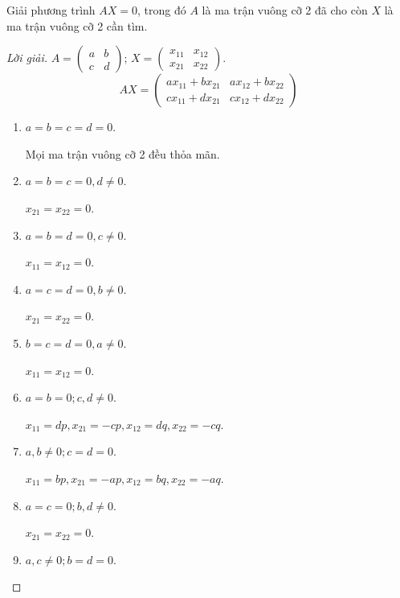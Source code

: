 \begin{exercise}
    Giải phương trình $AX = 0$, trong đó $A$ là ma trận vuông cỡ 2 đã cho còn $X$ là ma trận vuông cỡ 2 cần tìm.
\end{exercise}

\begin{proof}[Lời giải]
    $A = \begin{pmatrix}a & b \\ c & d\end{pmatrix}$; $X = \begin{pmatrix}x_{11} & x_{12} \\ x_{21} & x_{22}\end{pmatrix}$.
    \[
        AX =
        \begin{pmatrix}
            ax_{11}+bx_{21} & ax_{12}+bx_{22} \\
            cx_{11}+dx_{21} & cx_{12}+dx_{22}
        \end{pmatrix}
    \]
    \begin{enumerate}[label = Trường hợp \arabic*:,itemindent=2cm]
        \item $a = b = c = d = 0$.
              
              Mọi ma trận vuông cỡ 2 đều thỏa mãn.
        \item $a = b = c = 0, d\ne 0$.
              
              $x_{21} = x_{22} = 0$.
        \item $a = b = d = 0, c\ne 0$.
              
              $x_{11} = x_{12} = 0$.
        \item $a = c = d = 0, b\ne 0$.
              
              $x_{21} = x_{22} = 0$.
        \item $b = c = d = 0, a\ne 0$.
              
              $x_{11} = x_{12} = 0$.
        \item $a = b = 0; c, d\ne 0$.
              
              $x_{11} = dp, x_{21} = -cp, x_{12} = dq, x_{22} = -cq$.
        \item $a, b\ne 0; c = d = 0$.
              
              $x_{11} = bp, x_{21} = -ap, x_{12} = bq, x_{22} = -aq$.
        \item $a = c = 0; b, d\ne 0$.
              
              $x_{21} = x_{22} = 0$.
        \item $a, c\ne 0; b = d = 0$.
              

\end{enumerate}
\end{proof}
